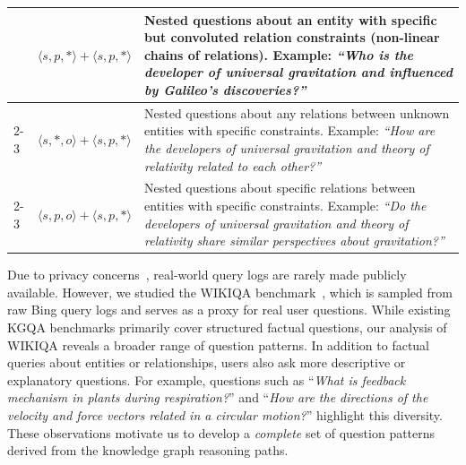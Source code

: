 \begin{table}[!t]
{\begin{tabular}{@{}llm{15cm}@{}}
& $\langle s,p,* \rangle + \langle s,p,* \rangle$ & Nested questions about an entity with specific but convoluted relation constraints (non-linear chains of relations). Example: \textit{``Who is the developer of universal gravitation and influenced by Galileo's discoveries?''} \\ \cmidrule(l){2-3}
& $\langle s,*,o \rangle + \langle s,p,* \rangle$ & Nested questions about any relations between unknown entities with specific constraints. Example: \textit{``How are the developers of universal gravitation and theory of relativity related to each other?''} \\ \cmidrule(l){2-3}
& $\langle s,p,o \rangle + \langle s,p,* \rangle$ & Nested questions about specific relations between entities with specific constraints. Example: \textit{``Do the developers of universal gravitation and theory of relativity share similar perspectives about gravitation?''} \\ \bottomrule
\end{tabular}%
}
\end{table}

 Due to privacy concerns~\cite{aolquerylog}, real-world query logs are rarely made publicly available. However, we studied the WIKIQA benchmark~\cite{wikiqa}, which is sampled from raw Bing query logs and serves as a proxy for real user questions. While existing KGQA benchmarks primarily cover structured factual questions, our analysis of WIKIQA reveals a broader range of question patterns. In addition to factual queries about entities or relationships, users also ask more descriptive or explanatory questions. For example, questions such as ``\textit{What is feedback mechanism in plants during respiration?}'' and ``\textit{How are the directions of the velocity and force vectors related in a circular motion?}'' highlight this diversity. These observations motivate us to develop a \textit{complete} set of question patterns derived from the knowledge graph reasoning paths.

